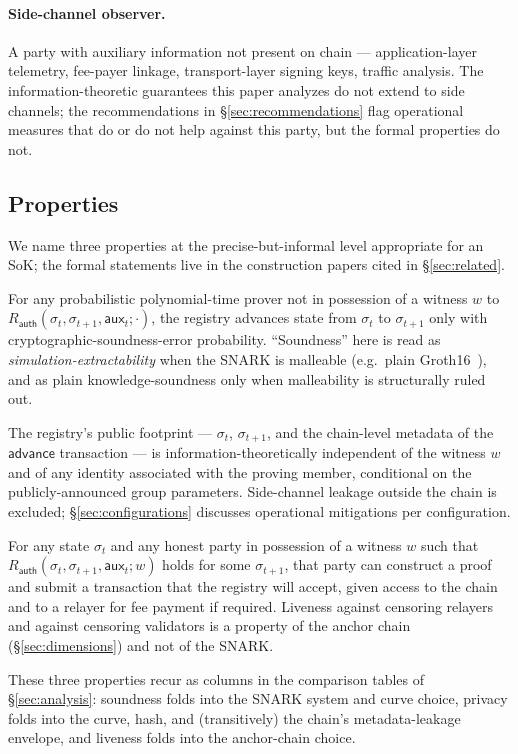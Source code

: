 \paragraph{Side-channel observer.} A party with auxiliary information
not present on chain --- application-layer telemetry, fee-payer
linkage, transport-layer signing keys, traffic analysis. The
information-theoretic guarantees this paper analyzes do not extend to
side channels; the recommendations in \S\ref{sec:recommendations}
flag operational measures that do or do not help against this party,
but the formal properties do not.

\subsection{Properties}

We name three properties at the precise-but-informal level appropriate
for an SoK; the formal statements live in the construction papers
cited in \S\ref{sec:related}.

\begin{property}
For any probabilistic polynomial-time prover not in possession of a
witness $w$ to $R_{\mathsf{auth}}(\sigma_t, \sigma_{t+1},
\mathsf{aux}_t; \cdot)$, the registry advances state from $\sigma_t$
to $\sigma_{t+1}$ only with cryptographic-soundness-error
probability. ``Soundness'' here is read as
\emph{simulation-extractability} when the SNARK is malleable (e.g.\
plain Groth16~\cite{groth-2016-onpairing}), and as plain
knowledge-soundness only when malleability is structurally ruled out.
\end{property}

\begin{property}
The registry's public footprint --- $\sigma_t$, $\sigma_{t+1}$, and
the chain-level metadata of the $\mathsf{advance}$ transaction --- is
information-theoretically independent of the witness $w$ and of any
identity associated with the proving member, conditional on the
publicly-announced group parameters. Side-channel leakage outside the
chain is excluded; \S\ref{sec:configurations} discusses operational
mitigations per configuration.
\end{property}

\begin{property}[Liveness]
For any state $\sigma_t$ and any honest party in possession of a
witness $w$ such that $R_{\mathsf{auth}}(\sigma_t, \sigma_{t+1},
\mathsf{aux}_t; w)$ holds for some $\sigma_{t+1}$, that party can
construct a proof and submit a transaction that the registry will
accept, given access to the chain and to a relayer for fee payment if
required. Liveness against censoring relayers and against censoring
validators is a property of the anchor chain (\S\ref{sec:dimensions})
and not of the SNARK.
\end{property}

These three properties recur as columns in the comparison tables of
\S\ref{sec:analysis}: soundness folds into the SNARK system and curve
choice, privacy folds into the curve, hash, and (transitively) the
chain's metadata-leakage envelope, and liveness folds into the
anchor-chain choice.
